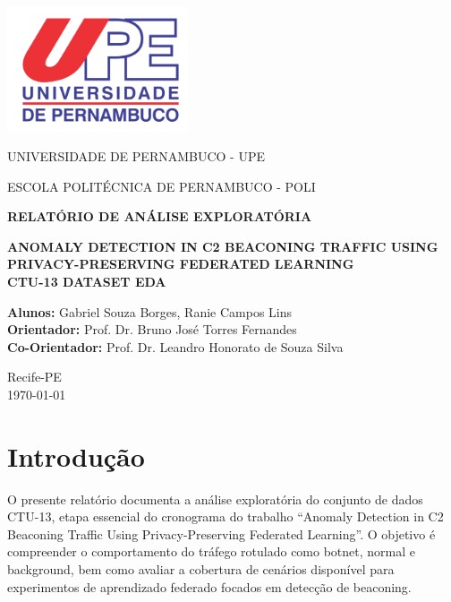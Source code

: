 \documentclass[a4paper, 12pt]{article}
\begin{document}
\begin{titlepage}
    \centering
    \includegraphics[width=0.4\textwidth]{upe.png}\par
    \vspace{1.5cm}

    {\large UNIVERSIDADE DE PERNAMBUCO - UPE}\par
    \vspace{0.2cm}
    {\large ESCOLA POLITÉCNICA DE PERNAMBUCO - POLI}

    \vfill

    {\Large \textbf{RELATÓRIO DE ANÁLISE EXPLORATÓRIA}}\par

    \vspace{1cm}

    {\huge \bfseries ANOMALY DETECTION IN C2 BEACONING TRAFFIC USING PRIVACY-PRESERVING FEDERATED LEARNING\\CTU-13 DATASET EDA}\par

    \vfill

    \begin{flushleft}
    \large
        \textbf{Alunos:} Gabriel Souza Borges, Ranie Campos Lins \\
        \textbf{Orientador:} Prof. Dr. Bruno José Torres Fernandes \\
        \textbf{Co-Orientador:} Prof. Dr. Leandro Honorato de Souza Silva
    \end{flushleft}

    \vfill

    \large
    Recife-PE \\
    \today
\end{titlepage}

\tableofcontents
\listoffigures
\listoftables

\newpage

\section{Introdução}
O presente relatório documenta a análise exploratória do conjunto de dados CTU-13, etapa essencial do cronograma do trabalho ``Anomaly Detection in C2 Beaconing Traffic Using Privacy-Preserving Federated Learning''. O objetivo é compreender o comportamento do tráfego rotulado como botnet, normal e background, bem como avaliar a cobertura de cenários disponível para experimentos de aprendizado federado focados em detecção de beaconing.
\end{document}
